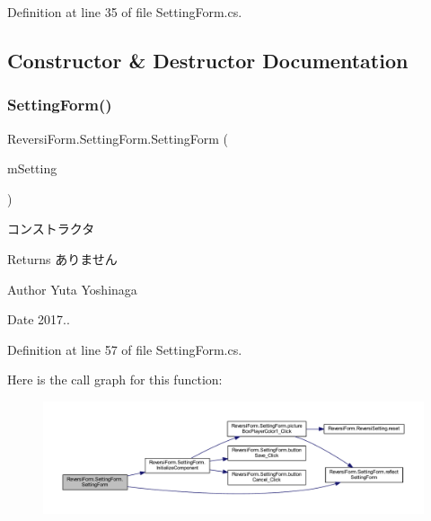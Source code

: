Definition at line 35 of file Setting\+Form.\+cs.



\subsection{Constructor \& Destructor Documentation}
\mbox{\label{class_reversi_form_1_1_setting_form_ac0583da0aa8221e0851b147271361ca8}} 
\subsubsection{\texorpdfstring{Setting\+Form()}{SettingForm()}}
{\footnotesize\ttfamily Reversi\+Form.\+Setting\+Form.\+Setting\+Form (\begin{DoxyParamCaption}\item[{\hyperlink{class_reversi_form_1_1_reversi_setting}{Reversi\+Setting}}]{m\+Setting }\end{DoxyParamCaption})}



コンストラクタ 

\begin{DoxyReturn}{Returns}
ありません 
\end{DoxyReturn}
\begin{DoxyAuthor}{Author}
Yuta Yoshinaga 
\end{DoxyAuthor}
\begin{DoxyDate}{Date}
2017.. 
\end{DoxyDate}


Definition at line 57 of file Setting\+Form.\+cs.

Here is the call graph for this function\+:
\nopagebreak
\begin{figure}[H]
\begin{center}
\leavevmode
\includegraphics[width=350pt]{class_reversi_form_1_1_setting_form_ac0583da0aa8221e0851b147271361ca8_cgraph}
\end{center}
\end{figure}


